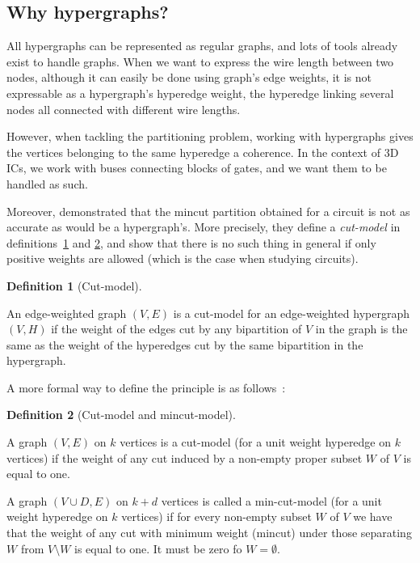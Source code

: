 \documentclass[11pt,a4paper]{report} %
\theoremstyle{customdef}
\newtheorem{definition}{Definition}
\newenvironment{defi}[2]
 {\begin{definition}[#1]\label{#2}\end{definition}\begin{siderules}}
 {\end{siderules}}
\begin{document}
\subsection{Why hypergraphs?}\label{sec:why-hypergraph}
All hypergraphs can be represented as regular graphs, and lots of tools already exist to handle graphs.
When we want to express the wire length between two nodes, although it can easily be done using graph's edge weights, it is not expressable as a hypergraph's hyperedge weight, the hyperedge linking several nodes all connected with different wire lengths.

However, when tackling the partitioning problem, working with hypergraphs gives the vertices belonging to the same hyperedge a coherence.
In the context of 3D ICs, we work with buses connecting blocks of gates, and we want them to be handled as such.

Moreover, \citet{Ihler1993} demonstrated that the mincut partition obtained for a circuit is not as accurate as would be a hypergraph's.
More precisely, they define a \textit{cut-model} in definitions~\ref{def:cut-model} and \ref{def:cut-model-formal}, and show that there is no such thing in general if only positive weights are allowed (which is the case when studying circuits).

\begin{defi}{Cut-model}{def:cut-model}
An edge-weighted graph $(V,E)$ is a cut-model for an edge-weighted hypergraph $(V,H)$ if the weight of the edges cut by any bipartition of $V$ in the graph is the same as the weight of the hyperedges cut by the same bipartition in the hypergraph.
\end{defi}

A more formal way to define the principle is as follows~:
\begin{defi}{Cut-model and mincut-model}{def:cut-model-formal}
A graph $(V, E)$ on $k$ vertices is a cut-model (for a unit weight hyperedge on $k$ vertices) if the weight of any cut induced by a non-empty proper subset $W$ of $V$ is equal to one.

A graph $(V \cup D,E)$ on $k+d$ vertices is called a min-cut-model (for a unit weight hyperedge on $k$ vertices) if for every non-empty subset $W$ of $V$ we have that the weight of any cut with minimum weight (mincut) under those separating $W$ from $V \setminus W$ is equal to one.
It must be zero fo $W=\emptyset$.%
\end{defi}
\end{document}

